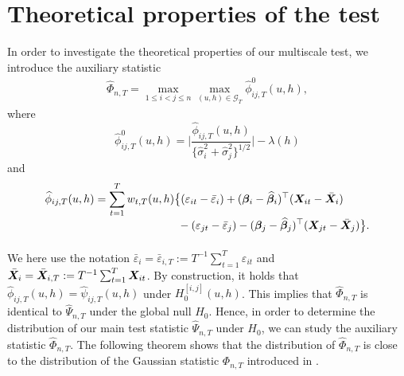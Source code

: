\documentclass[a4paper,12pt]{article}
\makeatletter
\renewcommand{\eqref}[1]{\tagform@{\ref{#1}}}
\makeatother
\begin{document}
\section{Theoretical properties of the test}\label{sec:theo}


In order to investigate the theoretical properties of our multiscale test, we introduce the auxiliary statistic
\begin{align}\label{eq:Phi_hat}
\widehat{\Phi}_{n,T} = \max_{1 \le i < j \le n}  \max_{(u,h) \in \mathcal{G}_T} \widehat{\phi}^0_{ij,T}(u,h),
\end{align}
where
\begin{equation*}%
\widehat{\phi}^0_{ij,T}(u,h) =\bigg| \frac{\widehat{\phi}_{ij,T}(u,h)} {\{ \widehat{\sigma}_i^2 + \widehat{\sigma}_j^2 \}^{1/2}} \bigg| - \lambda(h)
\end{equation*}
and
\begin{align*}
\widehat{\phi}_{ij,T}(u,h) 
 & = \sum_{t=1}^T w_{t,T}(u,h) \big\{ (\varepsilon_{it} - \bar{\varepsilon}_i) + (\bfbeta_i - \widehat{\bfbeta}_i)^\top (\X_{it} - \bar{\X}_{i}) \\[-0.4cm]
 & \phantom{= \sum_{t=1}^T w_{t,T}(u,h) \big\{} - (\varepsilon_{jt} - \bar{\varepsilon}_j) -  (\bfbeta_j - \widehat{\bfbeta}_j)^\top (\X_{jt} - \bar{\X}_{j}) \big\}.
\end{align*}
We here use the notation $\bar{\varepsilon}_i = \bar{\varepsilon}_{i,T} := T^{-1} \sum_{t=1}^T \varepsilon_{it}$ and $\bar{\boldsymbol{X}}_{i} =  \bar{\boldsymbol{X}}_{i, T} := T^{-1}\sum_{t=1}^T  \boldsymbol{X}_{it}$. By construction, it holds that $\widehat{\phi}_{ij,T}(u,h) = \widehat{\psi}_{ij,T}(u,h)$ under $H_0^{[i, j]}(u, h)$. This implies that $\widehat{\Phi}_{n,T}$ is identical to $\widehat{\Psi}_{n,T}$ under the global null $H_0$. Hence, in order to determine the distribution of our main test statistic $\widehat{\Psi}_{n,T}$ under $H_0$, we can study the auxiliary statistic $\widehat{\Phi}_{n,T}$. The following theorem shows that the distribution of $\widehat{\Phi}_{n,T}$ is close to the distribution of the Gaussian statistic $\Phi_{n,T}$ introduced in \eqref{eq:Phi}. 


\end{document}
